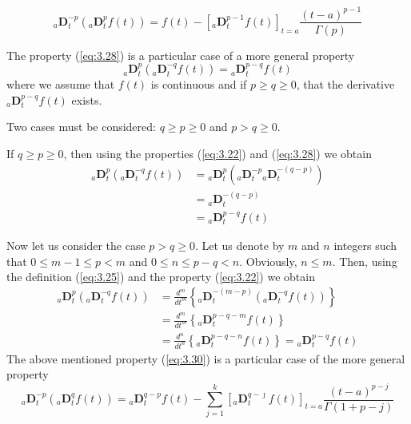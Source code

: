\documentclass[a4paper,14pt,oneside]{book}
\theoremstyle{plain}
\theoremstyle{definition}
\theoremstyle{remark}
\begin{document}
\begin{center}
\begin{flushleft}
\begin{equation}\label{eq:3.35}
{ }_{a} \mathbf{D}_{t}^{-p}\left({ }_{a} \mathbf{D}_{t}^{p} f(t)\right)=f(t)-\left[{ }_{a} \mathbf{D}_{t}^{p-1} f(t)\right]_{t=a} \frac{(t-a)^{p-1}}{\Gamma(p)}
\end{equation}
\par The property (\ref{eq:3.28}) is a particular case of a more general property
\begin{equation}\label{eq:3.36}
{ }_{a} \mathbf{D}_{t}^{p}\left({ }_{a} \mathbf{D}_{t}^{-q} f(t)\right)={ }_{a} \mathbf{D}_{t}^{p-q} f(t)
\end{equation}
where we assume that $f(t)$ is continuous and if $p \geq q \geq 0$, that the derivative ${ }_{a} \mathbf{D}_{t}^{p-q} f(t)$ exists.
\par Two cases must be considered: $q \geq p \geq 0$ and $p>q \geq 0$.
\par If $q \geq p \geq 0$, then using the properties (\ref{eq:3.22}) and (\ref{eq:3.28}) we obtain
$$
\begin{aligned}
{ }_{a} \mathbf{D}_{t}^{p}\left({ }_{a} \mathbf{D}_{t}^{-q} f(t)\right) &={ }_{a} \mathbf{D}_{t}^{p}\left({ }_{a} \mathbf{D}_{t}^{-p}{ }_{a} \mathbf{D}_{t}^{-(q-p)}\right) \\
&={ }_{a} \mathbf{D}_{t}^{-(q-p)}\\
&={ }_{a} \mathbf{D}_{t}^{p-q} f(t)
\end{aligned}
$$
\par Now let us consider the case $p>q \geq 0$. Let us denote by $m$ and $n$ integers such that $0 \leq m-1 \leq p<m$ and $0 \leq n \leq p-q<n$. Obviously, $n \leq m$. Then, using the definition (\ref{eq:3.25}) and the property (\ref{eq:3.22}) we obtain
$$
\begin{aligned}
{ }_{a} \mathbf{D}_{t}^{p}\left({ }_{a} \mathbf{D}_{t}^{-q} f(t)\right) &=\frac{d^{m}}{d t^{m}}\left\{{ }_{a} \mathbf{D}_{t}^{-(m-p)}\left({ }_{a} \mathbf{D}_{t}^{-q} f(t)\right)\right\} \\
&=\frac{d^{m}}{d t^{m}}\left\{{ }_{a} \mathbf{D}_{t}^{p-q-m} f(t)\right\} \\
&=\frac{d^{n}}{d t^{n}}\left\{{ }_{a} \mathbf{D}_{t}^{p-q-n} f(t)\right\}={ }_{a} \mathbf{D}_{t}^{p-q} f(t)
\end{aligned}
$$
The above mentioned property (\ref{eq:3.30}) is a particular case of the more general property
\begin{equation}\label{eq:3.37}
{ }_{a} \mathbf{D}_{t}^{-p}\left({ }_{a} \mathbf{D}_{t}^{q} f(t)\right)={ }_{a} \mathbf{D}_{t}^{q-p} f(t)-\sum_{j=1}^{k}\left[{ }_{a} \mathbf{D}_{t}^{q-\jmath} f(t)\right]_{t=a} \frac{(t-a)^{p-j}}{\Gamma(1+p-j)}

\end{equation}
\end{flushleft}
\end{center}
\end{document}
